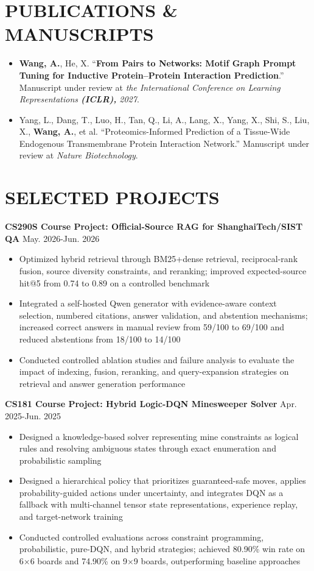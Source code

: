 \documentclass[a4paper,9pt]{extarticle}
\begin{document}
\section*{PUBLICATIONS \& MANUSCRIPTS}
\begin{itemize}
    \item \textbf{Wang, A.}, He, X. ``\textbf{From Pairs to Networks: Motif Graph Prompt Tuning for Inductive Protein--Protein Interaction Prediction}.'' Manuscript under review at \textit{the International Conference on Learning Representations \textbf{(ICLR),} 2027}.
    \item Yang, L., Dang, T., Luo, H., Tan, Q., Li, A., Lang, X., Yang, X., Shi, S., Liu, X., \textbf{Wang, A.}, et al. ``Proteomics-Informed Prediction of a Tissue-Wide Endogenous Transmembrane Protein Interaction Network.'' Manuscript under review at \textit{Nature Biotechnology}.
\end{itemize}

\newpage
\section*{SELECTED PROJECTS}
\noindent \textbf{CS290S Course Project: Official-Source RAG for ShanghaiTech/SIST QA} \hfill May. 2026-Jun. 2026
\begin{itemize}
    \item Optimized hybrid retrieval through BM25+dense retrieval, reciprocal-rank fusion, source diversity constraints, and reranking; improved expected-source hit@5 from 0.74 to 0.89 on a controlled benchmark
    \item Integrated a self-hosted Qwen generator with evidence-aware context selection, numbered citations, answer validation, and abstention mechanisms; increased correct answers in manual review from 59/100 to 69/100 and reduced abstentions from 18/100 to 14/100
    \item Conducted controlled ablation studies and failure analysis to evaluate the impact of indexing, fusion, reranking, and query-expansion strategies on retrieval and answer generation performance
\end{itemize}

\noindent \textbf{CS181 Course Project: Hybrid Logic-DQN Minesweeper Solver} \hfill Apr. 2025-Jun. 2025
\begin{itemize}
    \item Designed a knowledge-based solver representing mine constraints as logical rules and resolving ambiguous states through exact enumeration and probabilistic sampling
    \item Designed a hierarchical policy that prioritizes guaranteed-safe moves, applies probability-guided actions under uncertainty, and integrates DQN as a fallback with multi-channel tensor state representations, experience replay, and target-network training
    \item Conducted controlled evaluations across constraint programming, probabilistic, pure-DQN, and hybrid strategies; achieved 80.90\% win rate on 6$\times$6 boards and 74.90\% on 9$\times$9 boards, outperforming baseline approaches
\end{itemize}
\end{document}

